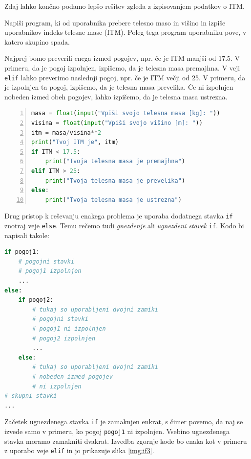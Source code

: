Zdaj lahko končno podamo lepšo rešitev zgleda z izpisovanjem podatkov o ITM.
\begin{zgled}
Napiši program, ki od uporabnika prebere telesno maso in višino in izpiše uporabnikov indeks telesne mase (ITM). Poleg tega program uporabniku pove, v katero skupino spada. 
\end{zgled}
\begin{resitev}
Najprej bomo preverili enega izmed pogojev, npr. če je ITM manjši od 17.5. V primeru, da je pogoj izpolnjen, izpišemo, da je telesna masa premajhna. V veji \texttt{elif} lahko preverimo naslednji pogoj, npr. če je ITM večji od 25. V primeru, da je izpolnjen ta pogoj, izpišemo, da je telesna masa prevelika. Če ni izpolnjen nobeden izmed obeh pogojev, lahko izpišemo, da je telesna masa ustrezna.
\begin{lstlisting}[language=Python,numbers=left]
masa = float(input("Vpiši svojo telesna masa [kg]: "))
visina = float(input("Vpiši svojo višino [m]: "))
itm = masa/visina**2
print("Tvoj ITM je", itm)
if ITM < 17.5:
    print("Tvoja telesna masa je premajhna")
elif ITM > 25:
    print("Tvoja telesna masa je prevelika")
else:
    print("Tvoja telesna masa je ustrezna")
\end{lstlisting}
\end{resitev}

Drug pristop k reševanju enakega problema je uporaba dodatnega stavka \texttt{if} znotraj veje \texttt{else}. Temu rečemo tudi \emph{gnezdenje} ali \emph{ugnezdeni stavek} \texttt{if}. Kodo bi napisali takole: \begin{lstlisting}[language=Python]
if pogoj1:
    # pogojni stavki
    # pogoj1 izpolnjen
    ...
else:
    if pogoj2:
        # tukaj so uporabljeni dvojni zamiki
        # pogojni stavki
        # pogoj1 ni izpolnjen
        # pogoj2 izpolnjen
        ...
    else:
        # tukaj so uporabljeni dvojni zamiki
        # nobeden izmed pogojev
        # ni izpolnjen
# skupni stavki
...
\end{lstlisting}
Začetek ugnezdenega stavka \texttt{if} je zamaknjen enkrat, s čimer povemo, da naj se izvede samo v primeru, ko pogoj \texttt{pogoj1} ni izpolnjen. Vsebino ugnezdenega stavka moramo zamakniti dvakrat. Izvedba zgornje kode bo enaka kot v primeru z uporabo veje \texttt{elif} in jo prikazuje slika \ref{img:if3}. 

